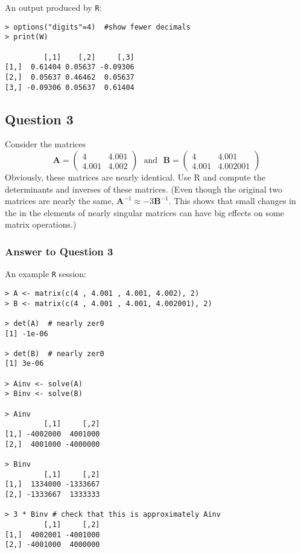 \documentclass[paper=a4, fontsize=11pt]{scrartcl} %
\begin{document}
An output produced by \texttt{R}:

\begin{lstlisting}[basicstyle=\ttfamily\small\bfseries]
> options("digits"=4)  #show fewer decimals
> print(W)

         [,1]    [,2]     [,3]
[1,]  0.61404 0.05637 -0.09306
[2,]  0.05637 0.46462  0.05637
[3,] -0.09306 0.05637  0.61404
\end{lstlisting}

\bigskip
\bigskip

\subsection*{Question 3}
Consider the matrices
$$
\mathbf{A} = 
\left( \begin{array}{cc}
  4 & 4.001 \\
  4.001 & 4.002
\end{array} \right) \ \ \ 
\text{and} \ \  \ 
\mathbf{B} = 
\left( \begin{array}{cc}
  4 & 4.001\\
  4.001 & 4.002001
\end{array} \right)
$$
Obviously, these matrices are nearly identical. Use {R} and compute the determinants and 
inverses of these matrices. (Even though the original two matrices are nearly the same, 
$\mathbf{A}^{-1} \approx -3 \mathbf{B}^{-1}$. This shows that small changes in the in 
the elements of nearly singular matrices can have big effects on some matrix operations.)

\bigskip
\subsubsection*{Answer to Question 3}
An example \texttt{R} session:
\begin{lstlisting}[basicstyle=\ttfamily\small\bfseries]
> A <- matrix(c(4 , 4.001 , 4.001, 4.002), 2)
> B <- matrix(c(4 , 4.001 , 4.001, 4.002001), 2)

> det(A)  # nearly zer0
[1] -1e-06

> det(B)  # nearly zer0
[1] 3e-06

> Ainv <- solve(A)  
> Binv <- solve(B)  

> Ainv
         [,1]     [,2]
[1,] -4002000  4001000
[2,]  4001000 -4000000

> Binv
         [,1]     [,2]
[1,]  1334000 -1333667
[2,] -1333667  1333333

> 3 * Binv # check that this is approximately Ainv
         [,1]     [,2]
[1,]  4002001 -4001000
[2,] -4001000  4000000

\end{lstlisting}
\bigskip
\bigskip
\pagebreak
\end{document}
